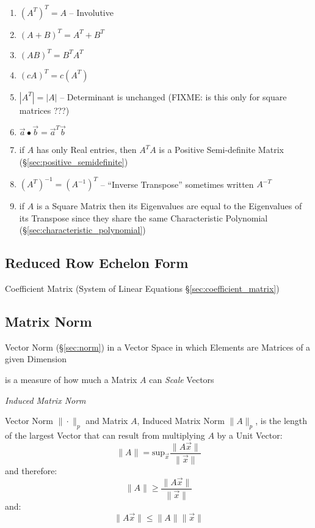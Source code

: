 \begin{enumerate}
  \item $(A^T)^T = A$ -- Involutive
  \item $(A+B)^T = A^T + B^T$
  \item $(AB)^T = B^T A^T$
  \item $(cA)^T = c(A^T)$
  \item $|A^T| = |A|$ -- Determinant is unchanged (FIXME: is this only for
    square matrices ???)
  \item $\vec{a} \bullet \vec{b} = \vec{a}^T\vec{b}$
  \item if $A$ has only Real entries, then $A^T A$ is a Positive Semi-definite
    Matrix (\S\ref{sec:positive_semidefinite})
  \item $(A^T)^{-1} = (A^{-1})^T$ -- ``Inverse Transpose'' sometimes written
    $A^{-T}$
  \item if $A$ is a Square Matrix then its Eigenvalues are equal to the
    Eigenvalues of its Transpose since they share the same Characteristic
    Polynomial (\S\ref{sec:characteristic_polynomial})
\end{enumerate}



\subsection{Reduced Row Echelon Form}\label{sec:reduced_row_echelon}

Coefficient Matrix (System of Linear Equations \S\ref{sec:coefficient_matrix})



\subsection{Matrix Norm}\label{sec:matrix_norm}

Vector Norm (\S\ref{sec:norm}) in a Vector Space in which Elements are Matrices
of a given Dimension

is a measure of how much a Matrix $A$ can \emph{Scale} Vectors

\emph{Induced Matrix Norm}

Vector Norm $\|\cdot\|_p$ and Matrix $A$, Induced Matrix Norm $\|A\|_p$, is the
length of the largest Vector that can result from multiplying $A$ by a Unit
Vector:
\[
  \|A\| = \mathrm{sup}_{\vec{x}} \frac{\|A\vec{x}\|}{\|\vec{x}\|}
\]
and therefore:
\[
  \|A\| \geq \frac{\|A\vec{x}\|}{\|\vec{x}\|}
\]
and:
\[
  \|A\vec{x}\| \leq \|A\| \|\vec{x}\|
\]

